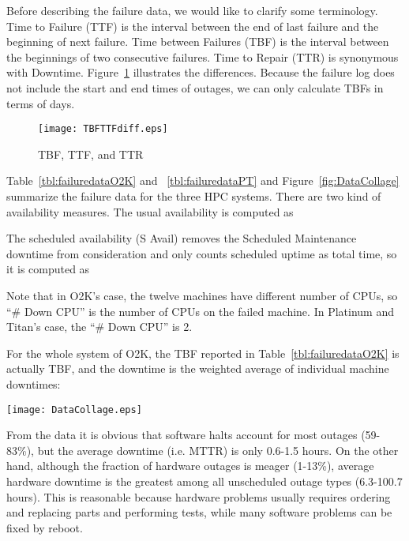 \documentclass[10pt,twocolumn]{article}
\begin{document}
\label{s:prelim}
Before describing the failure data, we would like to clarify some 
terminology. Time to Failure (TTF) is the interval between the 
end of last failure and the beginning of next failure.  
Time between Failures (TBF) is the interval between the 
beginnings of two consecutive failures. Time to Repair (TTR) 
is synonymous with Downtime. Figure~\ref{fig:TBFTTFdiff} 
illustrates the differences. Because the failure log does not 
include the start and end times of outages, we can only 
calculate TBFs in terms of days.

\begin{figure}[h]
   \begin{center}
   \texttt{[image: TBFTTFdiff.eps]} 
    \caption{TBF, TTF, and TTR}
    \label{fig:TBFTTFdiff}
   \end{center}
\end{figure}

Table~\ref{tbl:failuredataO2K} and ~\ref{tbl:failuredataPT} 
and Figure~\ref{fig:DataCollage} summarize the failure data 
for the three HPC systems. There are two kind of availability 
measures. The usual availability is computed as

The scheduled availability (S Avail) removes the 
Scheduled Maintenance downtime from consideration
and only counts scheduled uptime as total time, so
it is computed as

Note that in O2K's case, the twelve machines have different 
number of CPUs, so ``\# Down CPU'' is the number of CPUs on the 
failed machine. In Platinum and Titan's case, the 
``\# Down CPU'' is 2. 

For the whole system of O2K, the TBF reported in 
Table~\ref{tbl:failuredataO2K} is actually TBF, and the 
downtime is the weighted average of individual machine 
downtimes:


\begin{figure*}
   \begin{center}
   \texttt{[image: DataCollage.eps]} 
    \caption{The rows from top to bottom depict weekly Availability, Outages, 
     Downtime, and Failure Clustering (see \S\ref{s:corr}), 
     respectively. The X axis in all plots is week. The Y axis in 
     Downtime row is CPU-hours and in Failure Clustering row, the number
     of machines/nodes involved.}
    \label{fig:DataCollage}
   \end{center}
\end{figure*}

From the data it is obvious that software halts account for most 
outages (59-83\%), but the average downtime (i.e. MTTR) is only 
0.6-1.5 hours. On the other hand, although the fraction of hardware 
outages is meager (1-13\%), average hardware downtime is 
the greatest among all unscheduled outage types (6.3-100.7 hours). 
This is reasonable because hardware problems usually 
requires ordering and replacing parts and performing tests, while
many software problems can be fixed by reboot.
\end{document}
